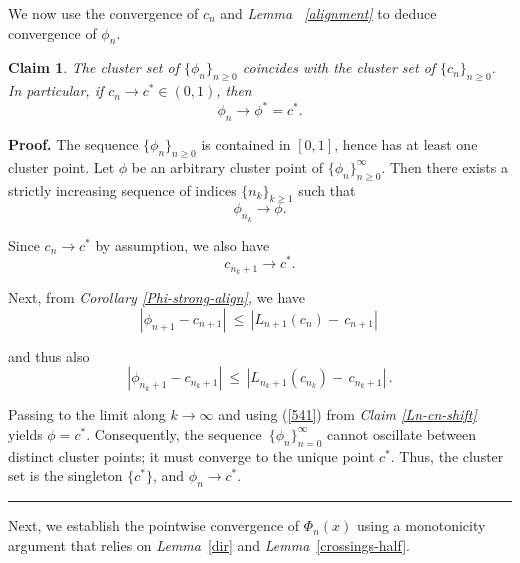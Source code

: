 \documentclass[onecolumn]{article}
\newtheorem{claim}[theorem]{Claim}
\newenvironment{proof}[1][Proof]{\noindent\textbf{#1.} }{\ \rule{0.5em}{0.5em}}
\begin{document}
We now use the convergence of $c_{n}$ and \textit{Lemma ~\ref{alignment}} to
deduce convergence of $\phi _{n}$.

\begin{claim}
\label{cluster} The cluster set of $\{\phi _{n}\}_{n\geq 0}$ coincides with
the cluster set of $\{c_{n}\}_{n\geq 0}$. In particular, if $%
c_{n}\rightarrow c^{\ast }\in (0,1)$, then 
\begin{equation}
\phi _{n}\rightarrow \phi ^{\ast }=c^{\ast }.  \label{536a}
\end{equation}
\end{claim}

\begin{proof}
The sequence $\{\phi _{n}\}_{n\geq 0}$ is contained in $[0,1]$, hence has at
least one cluster point. Let $\phi $ be an arbitrary cluster point of $%
\{\phi _{n}\}_{n\geq 0}^{\infty }$. Then there exists a strictly increasing
sequence of indices $\{n_{k}\}_{k\geq 1}$ such that 
\begin{equation}
\phi _{n_{k}}\rightarrow \phi .  \label{537}
\end{equation}

Since $c_{n}\rightarrow c^{\ast }$ by assumption, we also have 
\begin{equation}
c_{n_{k}+1}\rightarrow c^{\ast }.  \label{538}
\end{equation}

Next, from \textit{Corollary \ref{Phi-strong-align}, }we have%
\begin{equation}
\ \left\vert \phi _{n+1}-c_{n+1}\right\vert \ \leq \,\left\vert
L_{n+1}(c_{n})-\,c_{n+1}\right\vert \,\   \label{545e}
\end{equation}

and thus also%
\begin{equation}
\ \left\vert \phi _{n_{k}+1}-c_{n_{k}+1}\right\vert \ \leq \,\left\vert
L_{n_{k}+1}(c_{n_{k}})-\,c_{n_{k}+1}\right\vert \,.\   \label{545f}
\end{equation}

Passing to the limit along $k\rightarrow \infty $ and using (\ref{541}) from 
\textit{Claim \ref{Ln-cn-shift}} yields $\phi =c^{\ast }$. Consequently, the
sequence $\,\{\phi _{n}\}_{n=0}^{\infty }$ cannot oscillate between distinct
cluster points; it must converge to the unique point $c^{\ast }$. Thus, the
cluster set is the singleton $\{c^{\ast }\}$, and $\phi _{n}${}$%
\longrightarrow c^{\ast }$.
\end{proof}

Next, we establish the pointwise convergence of $\Phi _{n}(x)$ using a
monotonicity argument that relies on \textit{Lemma}~\ref{dir} and \textit{%
Lemma}~\ref{crossings-half}.
\end{document}
